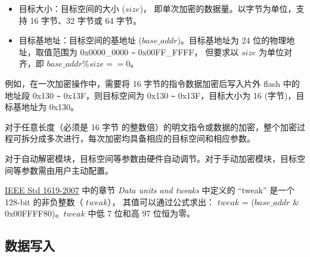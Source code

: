 \documentclass[main\_\_CN.tex]{subfiles}
\begin{document}
\begin{itemize}
    \item 目标大小：目标空间的大小 (\begin{math} size \end{math})， 即单次加密的数据量。以字节为单位，支持 16 字节、32 字节或 64 字节。
    \item 目标基地址：目标空间的基地址 (\begin{math} base\_addr\end{math})。目标基地址为 24 位的物理地址，取值范围为 0x0000\_0000 \verb+~+ 0x00FF\_FFFF， 但要求以 \begin{math} size \end{math} 为单位对齐，即 \begin{math} base\_addr \% size == 0 \end{math}。
\end{itemize}

例如，在一次加密操作中，需要将 16 字节的指令数据加密后写入片外 flash 中的地址段 0x130 \verb+~+ 0x13F，则目标空间为 0x130 \verb+~+ 0x13F，目标大小为 16 (字节)，目标基地址为 0x130。

对于任意长度（必须是 16 字节 的整数倍）的明文指令或数据的加密，整个加密过程可拆分成多次进行，每次加密均具备相应的目标空间和相应参数。

对于自动解密模块，目标空间等参数由硬件自动调节。对于手动加密模块，目标空间等参数需由用户主动配置。

\begin{tiplisting}
\vspace{-2em}
\begin{enumerate}
     \href{https://ieeexplore.ieee.org/document/4493450}{IEEE Std 1619-2007} 中的章节 \textit{Data units and tweaks} 中定义的 “tweak”  是一个 128-bit 的非负整数（ \begin{math} tweak \end{math}），
    其值可以通过公式求出： \begin{math} tweak \end{math} = (\begin{math} base\_addr \end{math} \& 0x00FFFF80)。\begin{math} tweak \end{math} 中低 7 位和高 97 位恒为零。
\end{enumerate}
\end{tiplisting}

\subsection{数据写入}
\label{sec:extmemncr-data-writing}
\end{document}
